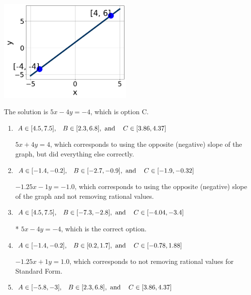 \documentclass{extbook}[14pt]
\begin{document}
\begin{enumerate}
{\begin{center}
    \includegraphics[width=0.5\textwidth]{../Figures/linearGraphToStandardCopyC.png}
\end{center}




The solution is \( 5x - 4y = -4 \), which is option C.\begin{enumerate}[label=\Alph*.]
\item \( A \in [4.5, 7.5], \hspace{3mm} B \in [2.3, 6.8], \text{ and } \hspace{3mm} C \in [3.86, 4.37] \)

 $5x + 4y = 4$, which corresponds to using the opposite (negative) slope of the graph, but did everything else correctly.
\item \( A \in [-1.4, -0.2], \hspace{3mm} B \in [-2.7, -0.9], \text{ and } \hspace{3mm} C \in [-1.9, -0.32] \)

 $-1.25x - 1y = -1.0$, which corresponds to using the opposite (negative) slope of the graph and not removing rational values.
\item \( A \in [4.5, 7.5], \hspace{3mm} B \in [-7.3, -2.8], \text{ and } \hspace{3mm} C \in [-4.04, -3.4] \)

* $5x - 4y = -4$, which is the correct option.
\item \( A \in [-1.4, -0.2], \hspace{3mm} B \in [0.2, 1.7], \text{ and } \hspace{3mm} C \in [-0.78, 1.88] \)

 $-1.25x + 1y = 1.0$, which corresponds to not removing rational values for Standard Form.
\item \( A \in [-5.8, -3], \hspace{3mm} B \in [2.3, 6.8], \text{ and } \hspace{3mm} C \in [3.86, 4.37] \)


\end{enumerate}}
\end{enumerate}
\end{document}
